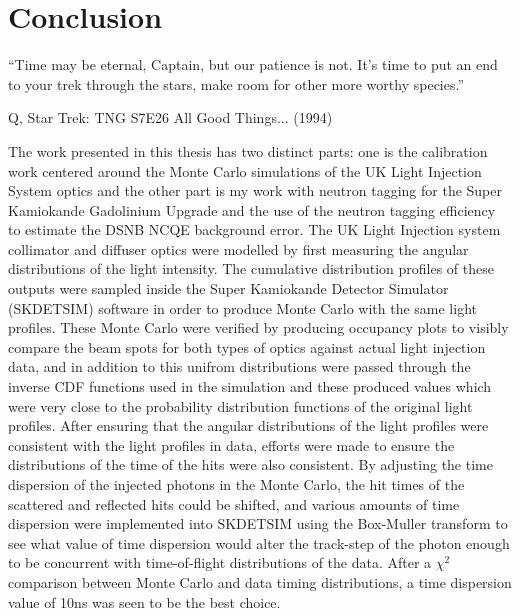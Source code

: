 \chapter{Conclusion}
\epigraph{``Time may be eternal, Captain, but our patience is not. It's time to put an end to your trek through the stars, make room for other more worthy species.''}{Q, Star Trek: TNG S7E26 All Good Things... (1994)}
\label{chp:conc}

The work presented in this thesis has two distinct parts: one is the calibration work centered around the Monte Carlo simulations of the UK Light Injection System optics and the other part is my work with neutron tagging for the Super Kamiokande Gadolinium Upgrade and the use of the neutron tagging efficiency to estimate the DSNB NCQE background error. 
\newline
The UK Light Injection system collimator and diffuser optics were modelled by first measuring the angular distributions of the light intensity. The cumulative distribution profiles of these outputs were sampled inside the Super Kamiokande Detector Simulator (SKDETSIM) software in order to produce Monte Carlo with the same light profiles. These Monte Carlo were verified by producing occupancy plots to visibly compare the beam spots for both types of optics against actual light injection data, and in addition to this unifrom distributions were passed through the inverse CDF functions used in the simulation and these produced values which were very close to the probability distribution functions of the original light profiles. After ensuring that the angular distributions of the light profiles were consistent with the light profiles in data, efforts were made to ensure the distributions of the time of the hits were also consistent. By adjusting the time dispersion of the injected photons in the Monte Carlo, the hit times of the scattered and reflected hits could be shifted, and various amounts of time dispersion were implemented into SKDETSIM using the Box-Muller transform to see what value of time dispersion would alter the track-step of the photon enough to be concurrent with time-of-flight distributions of the data. After a $\chi^{2}$ comparison between Monte Carlo and data timing distributions, a time dispersion value of 10ns was seen to be the best choice.
\newline

